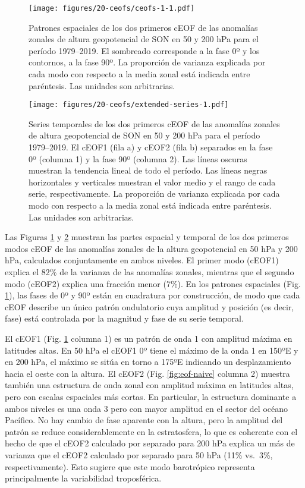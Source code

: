\documentclass[12pt,oneside]{reedthesis}
\begin{document}
\begin{figure}
\centering
\texttt{[image: figures/20-ceofs/ceofs-1-1.pdf]}
\caption{\label{fig:ceofs-1}Patrones espaciales de los dos primeros cEOF de las anomalías zonales de altura geopotencial de SON en 50 y 200 hPa para el período 1979--2019. El sombreado corresponde a la fase 0º y los contornos, a la fase 90º. La proporción de varianza explicada por cada modo con respecto a la media zonal está indicada entre paréntesis. Las unidades son arbitrarias.}
\end{figure}

\begin{figure}
\centering
\texttt{[image: figures/20-ceofs/extended-series-1.pdf]}
\caption{\label{fig:extended-series}Series temporales de los dos primeros cEOF de las anomalías zonales de altura geopotencial de SON en 50 y 200 hPa para el período 1979--2019. El cEOF1 (fila a) y cEOF2 (fila b) separados en la fase 0º (columna 1) y la fase 90º (columna 2). Las líneas oscuras muestran la tendencia lineal de todo el período. Las líneas negras horizontales y verticales muestran el valor medio y el rango de cada serie, respectivamente. La proporción de varianza explicada por cada modo con respecto a la media zonal está indicada entre paréntesis. Las unidades son arbitrarias.}
\end{figure}
Las Figuras \ref{fig:ceofs-1} y \ref{fig:extended-series} muestran las partes espacial y temporal de los dos primeros modos cEOF de las anomalías zonales de la altura geopotencial en 50 hPa y 200 hPa, calculados conjuntamente en ambos niveles.
El primer modo (cEOF1) explica el 82\% de la varianza de las anomalías zonales, mientras que el segundo modo (cEOF2) explica una fracción menor (7\%).
En los patrones espaciales (Fig. \ref{fig:ceofs-1}), las fases de 0º y 90º están en cuadratura por construcción, de modo que cada cEOF describe un único patrón ondulatorio cuya amplitud y posición (es decir, fase) está controlada por la magnitud y fase de su serie temporal.

El cEOF1 (Fig. \ref{fig:ceofs-1} columna 1) es un patrón de onda 1 con amplitud máxima en latitudes altas.
En 50 hPa el cEOF1 0º tiene el máximo de la onda 1 en 150ºE y en 200 hPa, el máximo se sitúa en torno a 175ºE indicando un desplazamiento hacia el oeste con la altura.
El cEOF2 (Fig. \ref{fig:eof-naive} columna 2) muestra también una estructura de onda zonal con amplitud máxima en latitudes altas, pero con escalas espaciales más cortas.
En particular, la estructura dominante a ambos niveles es una onda 3 pero con mayor amplitud en el sector del océano Pacífico.
No hay cambio de fase aparente con la altura, pero la amplitud del patrón se reduce considerablemente en la estratosfera, lo que es coherente con el hecho de que el cEOF2 calculado por separado para 200 hPa explica un más de varianza que el cEOF2 calculado por separado para 50 hPa (11\% vs.~3\%, respectivamente).
Esto sugiere que este modo barotrópico representa principalmente la variabilidad troposférica.
\end{document}

